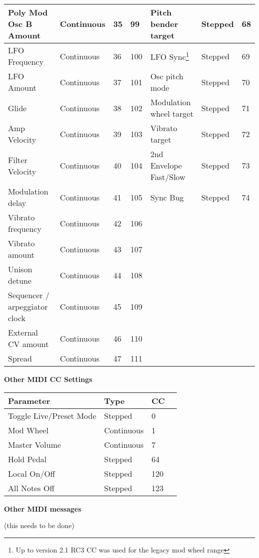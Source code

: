 \begin{longtable}[l]{ p{5cm}|p{2cm}|p{1.5cm}|p{1.5cm}|p{5cm}|p{2cm}|p{1cm}}
Poly Mod Osc B Amount & Continuous & 35 & 99 & Pitch bender target & Stepped & 68 \\ \hline
LFO Frequency & Continuous & 36 & 100 & LFO Sync\footnote{Up to version 2.1 RC3 CC was used for the legacy mod wheel range} & Stepped & 69 \\ \hline
LFO Amount & Continuous & 37 & 101 & Osc pitch mode & Stepped & 70 \\ \hline
Glide & Continuous & 38 & 102 & Modulation wheel target & Stepped & 71 \\ \hline
Amp Velocity & Continuous & 39 & 103 & Vibrato target & Stepped & 72 \\ \hline
Filter Velocity & Continuous & 40 & 104 &  2nd Envelope Fast/Slow & Stepped & 73 \\ \hline
Modulation delay & Continuous & 41 & 105 & Sync Bug & Stepped & 74 \\ \hline
Vibrato frequency & Continuous & 42 & 106 & & & \\ \hline
Vibrato amount & Continuous & 43 & 107 & &  & \\ \hline
Unison detune & Continuous & 44 & 108 & & &  \\ \hline
Sequencer / arpeggiator clock & Continuous & 45 & 109 &  &  &  \\ \hline
External CV amount & Continuous & 46 & 110 &  &  &  \\ \hline
Spread & Continuous & 47 & 111 &  &  &  \\ \hline 
\end{longtable}

\textbf{Other MIDI CC Settings}

\begin{longtable}[l]{ p{5cm}|p{2cm}|p{2cm}|p{1cm}} 
\textbf{Parameter} & \textbf{Type} & \textbf{ CC} \\ \hline
Toggle Live/Preset Mode & Stepped & 0 & \\ \hline
Mod Wheel & Continuous & 1 & \\ \hline
Master Volume & Continuous & 7 & \\ \hline
Hold Pedal & Stepped & 64 & \\ \hline
Local On/Off & Stepped & 120 & \\ \hline
All Notes Off & Stepped & 123 & \\ \hline
\end{longtable}

\textbf{Other MIDI messages}

(this needs to be done)


